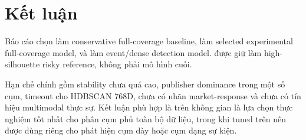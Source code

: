 \section{Kết luận}

Báo cáo chọn  làm conservative full-coverage baseline,  làm selected experimental full-coverage model, và  làm event/dense detection model.  được giữ làm high-silhouette risky reference, không phải mô hình cuối.

Hạn chế chính gồm stability chưa quá cao, publisher dominance trong một số cụm, timeout cho HDBSCAN 768D, chưa có nhãn market-response và chưa có tín hiệu multimodal thực sự. Kết luận phù hợp là  trên không gian  là lựa chọn thực nghiệm tốt nhất cho phân cụm phủ toàn bộ dữ liệu, trong khi  tuned trên  nên được dùng riêng cho phát hiện cụm dày hoặc cụm dạng sự kiện.
